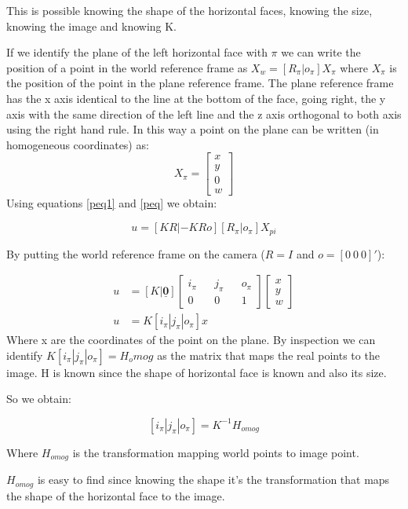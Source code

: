 \documentclass[11pt, oneside]{article}   	%
\begin{document}
This is possible knowing the shape of the horizontal faces, knowing the size, knowing the image and knowing K.

If we identify the plane of the left horizontal face with $\pi$ we can write the position of a point in the world reference frame as $ X_w =[R_{\pi} | o_{\pi}]X_{\pi} $ where $X_{\pi} $ is the position of the point in the plane reference frame. 
The plane reference frame has the x axis identical to the line at the bottom of the face, going right, the y axis with the same direction of the left line and the z axis orthogonal to both axis using the right hand rule.
In this way a point on the plane can be written (in homogeneous coordinates) as:
$$
X_\pi = \begin{bmatrix}
x \\
y \\
0 \\
w
\end{bmatrix}
$$
Using equations \ref{peq1} and \ref{peq} we obtain:

$$
u = [KR | -KRo] [R_{\pi} | o_{\pi}]X_{pi}
$$

By putting the world reference frame on the camera ($R=I$ and $o=[0 \ 0\ 0]'$):

\begin{subequations}
\begin{align*}
u  & = [K|\underline{\mathbf{0}}]
\begin{bmatrix}
i_\pi && j_\pi && o_\pi \\
0 && 0 && 1
\end{bmatrix} \begin{bmatrix}
x \\ y \\ w
\end{bmatrix} \\
u & = K [i_\pi | j_\pi | o_\pi] x
\end{align*}
\end{subequations}
Where x are the coordinates of the point on the plane. 
By inspection we can identify $K [i_\pi | j_\pi | o_\pi] = H_omog$ as the matrix that maps the real points to the image. H is known since the shape of horizontal face is known and also its size.

So we obtain:

$$[i_\pi | j_\pi | o_\pi]= K^{-1}H_{omog} $$

Where $H_{omog}$ is the transformation mapping world points to image point. 

$H_{omog}$ is easy to find since knowing the shape it's the transformation that maps the shape of the horizontal face to the image. 
\end{document}
